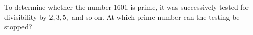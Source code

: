 To determine whether the number $1601$ is prime, it was successively tested for divisibility by $2, 3, 5,$ and so on. At which prime number can the testing be stopped?
